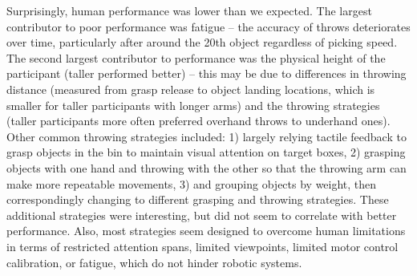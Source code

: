 \documentclass[journal]{IEEEtran}
\begin{document}
Surprisingly, human performance was lower than we  expected. The largest contributor to poor performance was fatigue -- the accuracy of throws deteriorates over time, particularly after around the 20th object regardless of picking speed. The second largest contributor to performance was the physical height of the participant (taller performed better) -- this may be due to differences in throwing distance (measured from grasp release to object landing locations, which is smaller for taller participants with longer arms) and the throwing strategies (taller participants more often preferred overhand throws to underhand ones). Other common throwing strategies included: 1) largely relying tactile feedback to grasp objects in the bin to maintain visual attention on target boxes, 2) grasping objects with one hand and throwing with the other so that the throwing arm can make more repeatable movements, 3) and grouping objects by weight, then correspondingly changing to different grasping and throwing strategies. These additional strategies were interesting, but did not seem to correlate with better performance. Also, most strategies seem designed to overcome human limitations in terms of restricted attention spans, limited viewpoints, limited motor control calibration, or fatigue, which do not hinder robotic systems.

\end{document}
